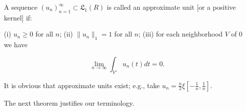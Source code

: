 A sequence $(u_n)_{n=1}^{\infty} \subset \mathfrak{L}_1(R)$ is called an approximate unit [or a positive kernel] if:

(i) $u_n \geq 0$ for all $n$;
(ii) $\|u_n\|_1 = 1$ for all $n$;
(iii) for each neighborhood $V$ of 0 we have

$$\lim_{n \to \infty} \int_{V'} u_n(t) dt = 0.$$

It is obvious that approximate units exist; e.g., take $u_n = \frac{n}{2} \xi \left[ -\frac{1}{n}, \frac{1}{n} \right]$.

The next theorem justifies our terminology.